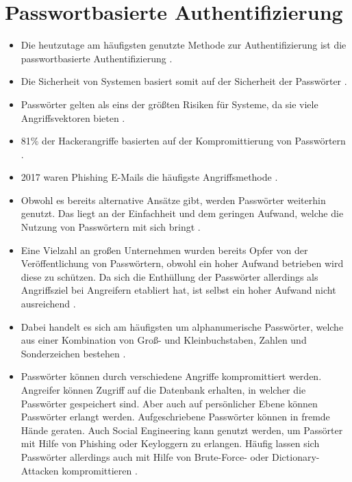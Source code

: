 \section{Passwortbasierte Authentifizierung}\label{pw-auth}

\begin{itemize}
    \item Die heutzutage am häufigsten genutzte Methode zur Authentifizierung ist die passwortbasierte Authentifizierung \cite{chanda2016password} \cite{boonkrong2012security} \cite{yildirim2019encouraging}.
    \item Die Sicherheit von Systemen basiert somit auf der Sicherheit der Passwörter \cite{boonkrong2012security}.
    \item Passwörter gelten als eins der größten Risiken für Systeme, da sie viele Angriffsvektoren bieten \cite{yildirim2019encouraging} \cite{farke2020you}.
    \item 81\% der Hackerangriffe basierten auf der Kompromittierung von Passwörtern \cite{barbosa2021provable}. 
    \item 2017 waren Phishing E-Mails die häufigste Angriffsmethode \cite{barbosa2021provable}.
    \item Obwohl es bereits alternative Ansätze gibt, werden Passwörter weiterhin genutzt. Das liegt an der Einfachheit und dem geringen Aufwand, welche die Nutzung von Passwörtern mit sich bringt \cite{yildirim2019encouraging}.
    \item Eine Vielzahl an großen Unternehmen wurden bereits Opfer von der Veröffentlichung von Passwörtern, obwohl ein hoher Aufwand betrieben wird diese zu schützen. Da sich die Enthüllung der Passwörter allerdings als Angriffsziel bei Angreifern etabliert hat, ist selbst ein hoher Aufwand nicht ausreichend \cite{boonkrong2012security}.
    \item Dabei handelt es sich am häufigsten um alphanumerische Passwörter, welche aus einer Kombination von Groß- und Kleinbuchstaben, Zahlen und Sonderzeichen bestehen \cite{chanda2016password}. 
    \item Passwörter können durch verschiedene Angriffe kompromittiert werden. Angreifer können Zugriff auf die Datenbank erhalten, in welcher die Passwörter gespeichert sind. Aber auch auf persönlicher Ebene können Passwörter erlangt werden. Aufgeschriebene Passwörter können in fremde Hände geraten. Auch Social Engineering kann genutzt werden, um Passörter mit Hilfe von Phishing oder Keyloggern zu erlangen. Häufig lassen sich Passwörter allerdings auch mit Hilfe von Brute-Force- oder Dictionary-Attacken kompromittieren \cite{chanda2016password} \cite{morii2017research}.

\end{itemize}
